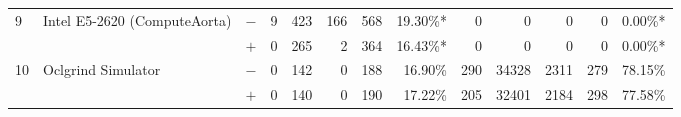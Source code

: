 \begin{tabular}{lll | rrrrr | rrrrr }
\hline
\multirow{ 2}{*}{9} & \multirow{ 2}{*}{Intel E5-2620 (ComputeAorta)} & $-$ & 9 & 423 & 166 & 568 & 19.30\%*       & 0 & 0 & 0 & 0 & 0.00\%* \\& & $+$ & 0 & 265 & 2 & 364 & 16.43\%* & 0 & 0 & 0 & 0 & 0.00\%* \\
\hline
\multirow{ 2}{*}{10} & \multirow{ 2}{*}{Oclgrind Simulator} & $-$ & 0 & 142 & 0 & 188 & 16.90\%       & 290 & 34328 & 2311 & 279 & 78.15\% \\& & $+$ & 0 & 140 & 0 & 190 & 17.22\% & 205 & 32401 & 2184 & 298 & 77.58\% \\
  \bottomrule
\end{tabular}

